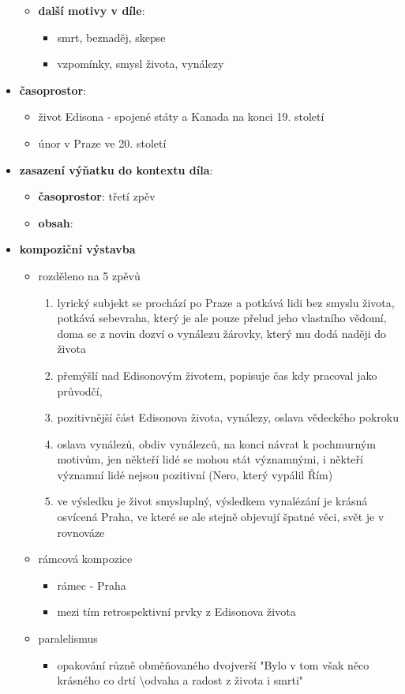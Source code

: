 \documentclass[10pt,a4paper]{article}
\begin{document}
\begin{itemize}
\begin{itemize}
	\item \textbf{další motivy v díle}:
		\begin{itemize}
		\item smrt, beznaděj, skepse
		\item vzpomínky, smysl života, vynálezy
		\end{itemize}
	\end{itemize}
\item \textbf{časoprostor}:
	\begin{itemize}
	\item život Edisona - spojené státy a Kanada na konci 19. století
	\item únor v Praze ve 20. století
	\end{itemize}
\item \textbf{zasazení výňatku do kontextu díla}:
	\begin{itemize}
	\item \textbf{časoprostor}: třetí zpěv
	\item \textbf{obsah}: 
	\end{itemize}
\item \textbf{kompoziční výstavba}
	\begin{itemize}
	\item rozděleno na 5 zpěvů
		\begin{enumerate}
		\item lyrický subjekt se prochází po Praze a potkává lidi bez smyslu života, potkává sebevraha, který je ale pouze přelud jeho vlastního vědomí, doma se z novin dozví o vynálezu žárovky, který mu dodá naději do života
		\item přemýšlí nad Edisonovým životem, popisuje čas kdy pracoval jako průvodčí, 
		\item pozitivnější část Edisonova života, vynálezy, oslava vědeckého pokroku
		\item oslava vynálezů, obdiv vynálezců, na konci návrat k pochmurným motivům, jen někteří lidé se mohou stát významnými, i někteří významní lidé nejsou pozitivní (Nero, který vypálil Řím)
		\item ve výsledku je život smysluplný, výsledkem vynalézání je krásná osvícená Praha, ve které se ale stejně objevují špatné věci, svět je v rovnováze
		\end{enumerate}
	\item rámcová kompozice
		\begin{itemize}
		\item rámec - Praha
		\item mezi tím retrospektivní prvky z Edisonova života
		\end{itemize}
	\item paralelismus
		\begin{itemize}
		\item opakování různě obměňovaného dvojverší "Bylo v tom však něco krásného co drtí \textbackslash odvaha a radost z života i smrti"
		\end{itemize}
	\end{itemize}
\end{itemize}
\end{document}
